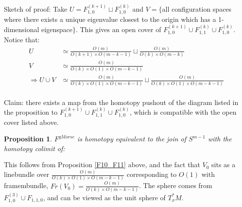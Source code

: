 \documentclass{article}
\newtheorem{proposition}[theorem]{Proposition}
\newtheorem{proposed work}[theorem]{Proposed Work}
\theoremstyle{definition}
\begin{document}
Sketch of proof: Take $U=F_{1,0}^{(k+1)}\sqcup F_{1,0}^{(k)}$ and $V=\lbrace$all configuration spaces where there exists a unique eigenvalue closest to the origin which has a 1-dimensional eigenspace$\rbrace$. This gives an open cover of $F_{1,0}^{(k+1)}\cup F_{1,1}^{(k)}\cup F_{1,0}^{(k)}$.\\

Notice that: 
\begin{align*}
U &\simeq \frac{O(m)}{O(k+1)\times O(m-k-1)}\sqcup \frac{O(m)}{O(k)\times O(m-k)}\\
V &\simeq \frac{O(m)}{O(k)\times O(1)\times O(m-k-1)}\\
\Rightarrow U\cup V &\simeq \frac{O(m)}{O(k)\times O(1)\times O(m-k-1)}\sqcup \frac{O(m)}{O(k)\times O(1)\times O(m-k-1)}\\
\end{align*}

Claim: there exists a map from the homotopy pushout of the diagram listed in the proposition to $F_{1,0}^{(k+1)}\cup F_{1,1}^{(k)}\cup F_{1,0}^{(k)}$, which is compatible with the open cover listed above. 


\begin{proposition}
$F^{gMorse}$ is homotopy equivalent to the join of $S^{m-1}$ with  the homotopy colimit of:\\
\begin{center}
	\end{center}
\end{proposition}
This follows from Proposition \ref{F10_F11} above, and the fact that $V_0$ sits as a linebundle over $\frac{O(m)}{O(k)\times O(1)\times O(m-k-1)}$ corresponding to $O(1)$ with framembundle, $Fr(V_0)=\frac{O(m)}{O(k)\times O(m-k-1)}$. The sphere comes from $F_{1,0}^{(3)}\cup F_{1,1,0}$, and can be viewed as the unit sphere of $T_x^*M$.
\end{document}
